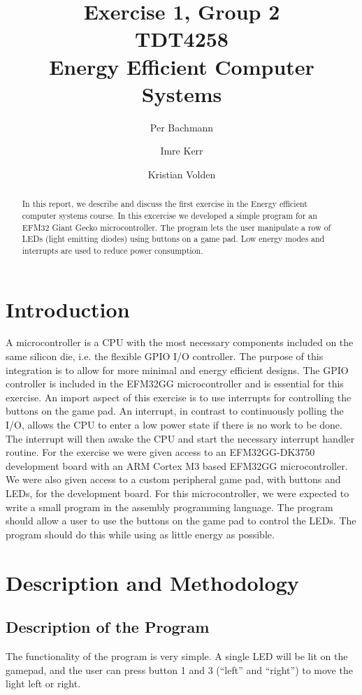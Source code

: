 \documentclass[a4paper, 12pt]{article}
\title{Exercise 1, Group 2 \\ TDT4258 \\ Energy Efficient Computer Systems}
\author{Per Bachmann \and Imre Kerr \and Kristian Volden}
\begin{document}
\maketitle
\begin{abstract}
	In this report, we describe and discuss the first exercise in the Energy efficient computer systems course. In this excercise we developed a simple program for an EFM32 Giant Gecko microcontroller. The program lets the user manipulate a row of LEDs (light emitting diodes) using buttons on a game pad. Low energy modes and interrupts are used to reduce power consumption.
\end{abstract}
\section{Introduction} %
\label{sec:introduction}
	A microcontroller is a CPU with the most necessary components included on the same silicon die, i.e. the flexible GPIO I/O controller. The purpose of this integration is to allow for more minimal and energy efficient designs. The GPIO controller is included in the EFM32GG microcontroller and is essential for this exercise.
	An import aspect of this exercise is to use interrupts for controlling the buttons on the game pad. An interrupt, in contrast to continuously polling the I/O, allows the CPU to enter a low power state if there is no work to be done. The interrupt will then awake the CPU and start the necessary interrupt handler routine.
	For the exercise we were given access to an EFM32GG-DK3750 development board with an ARM Cortex M3 based EFM32GG microcontroller. We were also given access to a custom peripheral game pad, with buttons and LEDs, for the development board. For this microcontroller, we were expected to write a small program in the assembly programming language. The program should allow a user to use the buttons on the game pad to control the LEDs. The program should do this while using as little energy as possible.

\section{Description and Methodology} %
\label{sec:description_and_methodology}
    \subsection{Description of the Program} %
    \label{sub:description_of_program}
        The functionality of the program is very simple. A single LED will be lit on the gamepad, and the user can press button 1 and 3 (``left'' and ``right'') to move the light left or right.
\end{document}
